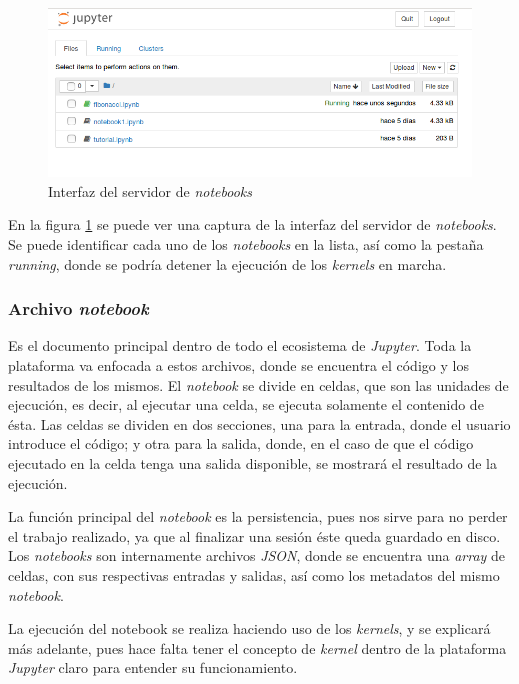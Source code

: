 \documentclass[11pt,spanish,listoffigures]{tfgetsinf}
\begin{document}
\begin{figure}[h]
	\centering
  	\includegraphics[width=\linewidth]{tree.png}
  	\caption{Interfaz del servidor de \textit{notebooks}}
  	\label{fig:tree}
\end{figure}

En la figura \ref{fig:tree} se puede ver una captura de la interfaz del servidor de \textit{notebooks}. Se puede identificar cada uno de los \textit{notebooks} en la lista, así como la pestaña \textit{running}, donde se podría detener la ejecución de los \textit{kernels} en marcha.


\subsubsection{Archivo \textit{notebook}}
\label{subsec:estructura-notebook}

Es el documento principal dentro de todo el ecosistema de \textit{Jupyter}. Toda la plataforma va enfocada a estos archivos, donde se encuentra el código y los resultados de los mismos. El \textit{notebook} se divide en celdas, que son las unidades de ejecución, es decir, al ejecutar una celda, se ejecuta solamente el contenido de ésta. Las celdas se dividen en dos secciones, una para la entrada, donde el usuario introduce el código; y otra para la salida, donde, en el caso de que el código ejecutado en la celda tenga una salida disponible, se mostrará el resultado de la ejecución. 

La función principal del \textit{notebook} es la persistencia, pues nos sirve para no perder el trabajo realizado, ya que al finalizar una sesión éste queda guardado en disco. Los \textit{notebooks} son internamente archivos \textit{JSON}, donde se encuentra una \textit{\gls{array}} de celdas, con sus respectivas entradas y salidas, así como los metadatos del mismo \textit{notebook}.

La ejecución del notebook se realiza haciendo uso de los \textit{kernels}, y se explicará más adelante, pues hace falta tener el concepto de \textit{kernel} dentro de la plataforma \textit{Jupyter} claro para entender su funcionamiento.
\end{document}
